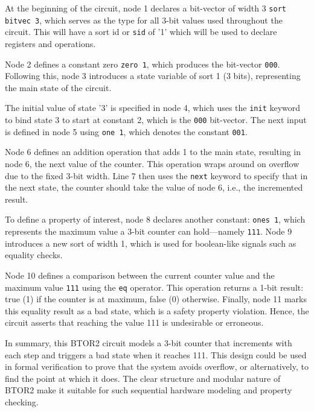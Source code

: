 At the beginning of the circuit, node 1 declares a bit-vector of width 3 \verb|sort bitvec 3|, which serves as the type for all 3-bit values used throughout the circuit. This will have a sort id or \verb|sid| of '1' which will be used to declare registers and operations.

Node 2 defines a constant zero \verb|zero 1|, which produces the bit-vector \verb|000|. Following this, node 3 introduces a state variable of sort 1 (3 bits), representing the main state of the circuit.

The initial value of state '3' is specified in node 4, which uses the \verb|init| keyword to bind state 3 to start at constant 2, which is the \verb|000| bit-vector. The next input is defined in node 5 using \verb|one 1|, which denotes the constant \verb|001|.

Node 6 defines an addition operation that adds 1 to the main state, resulting in node 6, the next value of the counter. This operation wraps around on overflow due to the fixed 3-bit width. Line 7 then uses the \verb|next| keyword to specify that in the next state, the counter should take the value of node 6, i.e., the incremented result.

To define a property of interest, node 8 declares another constant: \verb|ones 1|, which represents the maximum value a 3-bit counter can hold—namely \verb|111|. Node 9 introduces a new sort of width 1, which is used for boolean-like signals such as equality checks.

Node 10 defines a comparison between the current counter value and the maximum value \verb|111| using the \verb|eq| operator. This operation returns a 1-bit result: true (1) if the counter is at maximum, false (0) otherwise. Finally, node 11 marks this equality result as a bad state, which is a safety property violation. Hence, the circuit asserts that reaching the value 111 is undesirable or erroneous.

In summary, this BTOR2 circuit models a 3-bit counter that increments with each step and triggers a bad state when it reaches 111. This design could be used in formal verification to prove that the system avoids overflow, or alternatively, to find the point at which it does. The clear structure and modular nature of BTOR2 make it suitable for such sequential hardware modeling and property checking.


